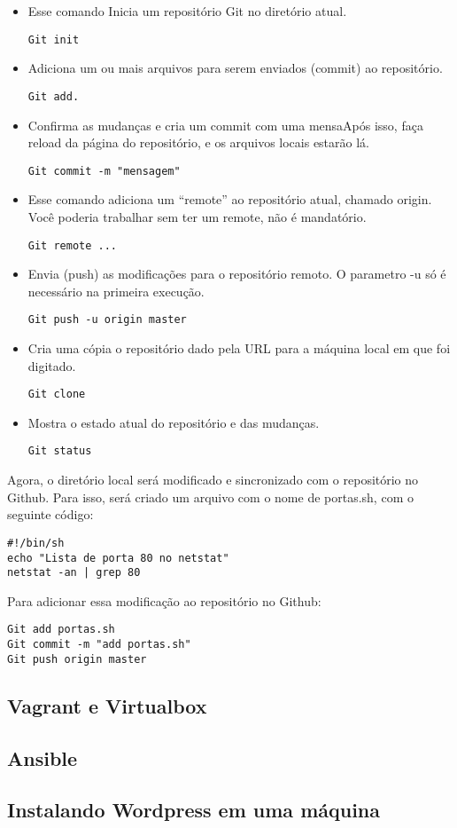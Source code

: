 \begin{itemize}

    \item Esse comando Inicia um repositório Git no 
    diretório atual.
	\begin{lstlisting}
Git init
	\end{lstlisting}
    \item Adiciona um ou mais arquivos para serem 
    enviados (commit) ao repositório.
	\begin{lstlisting}
Git add.
	\end{lstlisting}
    \item Confirma as mudanças e 
    cria um commit com uma mensaApós isso, faça reload da 
    página do repositório, e os arquivos locais estarão lá.
	\begin{lstlisting}
Git commit -m "mensagem"
	\end{lstlisting}    
    \item Esse comando adiciona um “remote” 
    ao repositório atual, chamado origin. Você poderia trabalhar 
    sem ter um remote, não é mandatório.
	\begin{lstlisting}
Git remote ...
	\end{lstlisting}
    \item Envia (push) as modificações 
    para o repositório remoto. O parametro -u só é necessário na 
    primeira execução.
	\begin{lstlisting}
Git push -u origin master
	\end{lstlisting}
    \item Cria uma cópia o repositório dado pela URL 
    para a máquina local em que foi digitado.
	\begin{lstlisting}
Git clone
	\end{lstlisting}
    \item Mostra o estado atual do repositório e 
    das mudanças.
	\begin{lstlisting}
Git status
	\end{lstlisting}
\end{itemize}

Agora, o diretório local será modificado e sincronizado 
com o repositório no Github. Para isso, será criado um 
arquivo com o nome de portas.sh, com o seguinte código:
    \begin{lstlisting}
#!/bin/sh
echo "Lista de porta 80 no netstat"
netstat -an | grep 80
    \end{lstlisting}
 
 Para adicionar essa modificação ao repositório no Github:
 
     \begin{lstlisting}
Git add portas.sh
Git commit -m "add portas.sh"
Git push origin master
    \end{lstlisting}
 
\subsection{Vagrant e Virtualbox}
\subsection{Ansible}
\subsection{Instalando Wordpress em uma máquina}

